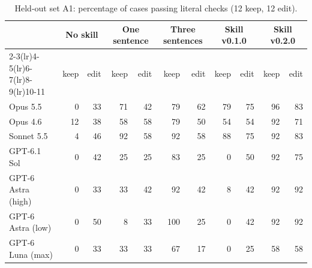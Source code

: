\begin{table}[t]\centering\small
\caption{Held-out set A1: percentage of cases passing literal checks (12 keep, 12 edit).}\label{tab:a1}
\begin{tabular}{lrrrrrrrrrr}
\toprule
 & \multicolumn{2}{c}{No skill} & \multicolumn{2}{c}{One sentence} & \multicolumn{2}{c}{Three sentences} & \multicolumn{2}{c}{Skill v0.1.0} & \multicolumn{2}{c}{Skill v0.2.0} \\
\cmidrule(lr){2-3}\cmidrule(lr){4-5}\cmidrule(lr){6-7}\cmidrule(lr){8-9}\cmidrule(lr){10-11}
 & keep & edit & keep & edit & keep & edit & keep & edit & keep & edit \\
\midrule
Opus 5.5 & 0 & 33 & 71 & 42 & 79 & 62 & 79 & 75 & 96 & 83 \\
Opus 4.6 & 12 & 38 & 58 & 58 & 79 & 50 & 54 & 54 & 92 & 71 \\
Sonnet 5.5 & 4 & 46 & 92 & 58 & 92 & 58 & 88 & 75 & 92 & 83 \\
GPT-6.1 Sol & 0 & 42 & 25 & 25 & 83 & 25 & 0 & 50 & 92 & 75 \\
GPT-6 Astra (high) & 0 & 33 & 33 & 42 & 92 & 42 & 8 & 42 & 92 & 92 \\
GPT-6 Astra (low) & 0 & 50 & 8 & 33 & 100 & 25 & 0 & 42 & 92 & 92 \\
GPT-6 Luna (max) & 0 & 33 & 33 & 33 & 67 & 17 & 0 & 25 & 58 & 58 \\
\bottomrule
\end{tabular}
\end{table}
